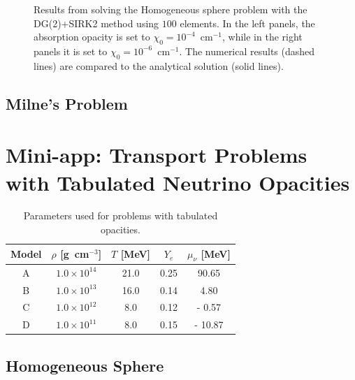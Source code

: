 \documentclass[10pt,preprint]{aastex}
\begin{document}
\begin{figure}
\begin{center}
\begin{tabular}{cc}
    \end{tabular}
  \end{center}
  \caption{Results from solving the Homogeneous sphere problem with the DG(2)+SIRK2 method using $100$ elements.  
  In the left panels, the absorption opacity is set to $\chi_{0}=10^{-4}$~cm$^{-1}$, while in the right panels it is set to $\chi_{0}=10^{-6}$~cm$^{-1}$.  
  The numerical results (dashed lines) are compared to the analytical solution (solid lines).}
  \label{fig:homogeneousSphere1D}
\end{figure}

\subsection{Milne's Problem}

\section{Mini-app: Transport Problems with Tabulated Neutrino Opacities}

\begin{table}
  \caption{Parameters used for problems with tabulated opacities. \label{tab:tabulatedModels}}
  \begin{tabular}{ccccc}
    Model & $\rho$ [g~cm$^{-3}$] & $T$ [MeV] & $Y_{e}$ & $\mu_{\nu}$ [MeV] \\
    \midrule \midrule
    A & $1.0\times10^{14}$ & 21.0  & 0.25 &   90.65 \\
    B & $1.0\times10^{13}$ & 16.0 & 0.14 &     4.80 \\
    C & $1.0\times10^{12}$ &   8.0 & 0.12 & -   0.57 \\
    D & $1.0\times10^{11}$ &   8.0 & 0.15 & - 10.87 \\
    \midrule \midrule
  \end{tabular}
\end{table}

\subsection{Homogeneous Sphere}
\end{document}

